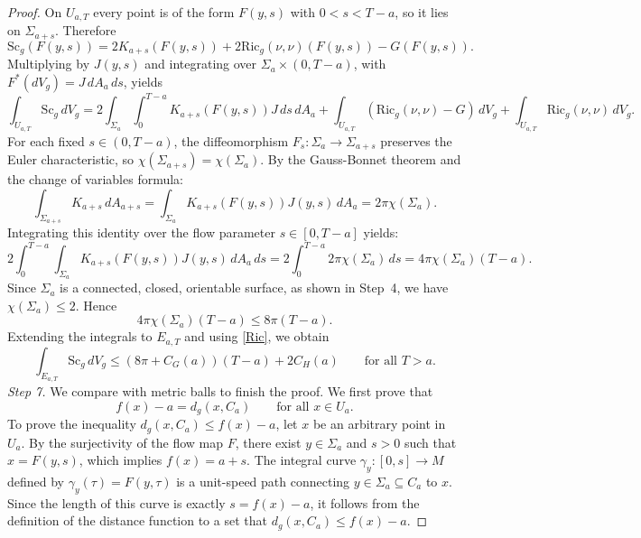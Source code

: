 \documentclass[12pt,oneside,a4paper]{article}
\theoremstyle{mytheorem}
\theoremstyle{remark}
\begin{document}
\begin{proof}
On $U_{a,T}$ every point is of the form $F(y,s)$ with $0<s<T-a$, so it lies on $\Sigma_{a+s}$. Therefore
\[
\mathrm{Sc}_g(F(y,s))=2K_{a+s}(F(y,s))+2\mathrm{Ric}_g(\nu,\nu)(F(y,s))-G(F(y,s)).
\]
Multiplying by $J(y,s)$ and integrating over $\Sigma_a\times(0,T-a)$, with $F^*(dV_g)=J\,dA_a\,ds$, yields
\[
\int_{U_{a,T}}\mathrm{Sc}_g\,dV_g=2\int_{\Sigma_a}\int_0^{T-a}K_{a+s}(F(y,s))J\,ds\,dA_a+\int_{U_{a,T}}(\mathrm{Ric}_g(\nu,\nu)-G)\,dV_g+\int_{U_{a,T}}\mathrm{Ric}_g(\nu,\nu)\,dV_g.
\]
For each fixed $s \in (0, T-a)$, the diffeomorphism $F_s : \Sigma_a \to \Sigma_{a+s}$ preserves the Euler characteristic, so $\chi(\Sigma_{a+s}) = \chi(\Sigma_a)$. By the Gauss-Bonnet theorem and the change of variables formula:$$\int_{\Sigma_{a+s}} K_{a+s} \, dA_{a+s} = \int_{\Sigma_a} K_{a+s}(F(y,s)) J(y,s) \, dA_a = 2\pi \chi(\Sigma_a).$$Integrating this identity over the flow parameter $s \in [0, T-a]$ yields:$$2 \int_0^{T-a} \int_{\Sigma_a} K_{a+s}(F(y,s)) J(y,s) \, dA_a \, ds = 2 \int_0^{T-a} 2\pi \chi(\Sigma_a) \, ds = 4\pi \chi(\Sigma_a)(T-a).$$
Since $\Sigma_a$ is a connected, closed, orientable surface, as shown in Step~4, we have $\chi(\Sigma_a)\le 2$. Hence
\[
4\pi \chi(\Sigma_a)(T-a)\le 8\pi (T-a).
\]
Extending the integrals to $E_{a,T}$ and using \eqref{Ric}, we obtain
\[
\int_{E_{a,T}} \mathrm{Sc}_g \, dV_g
\le (8\pi + C_G(a))(T-a) + 2C_H(a)
\qquad \text{for all } T>a .
\]
\textit{Step 7.} We compare with metric balls to finish the proof.
We first prove that
\[
f(x)-a=d_g(x,C_a)\qquad\text{for all }x\in U_a.
\]
 To prove the inequality $d_g(x, C_a) \le f(x) - a$, let $x$ be an arbitrary point in $U_a$. By the surjectivity of the flow map $F$, there exist $y \in \Sigma_a$ and $s > 0$ such that $x = F(y, s)$, which implies $f(x) = a + s$. The integral curve $\gamma_y : [0, s] \to M$ defined by $\gamma_y(\tau) = F(y, \tau)$ is a unit-speed path connecting $y \in \Sigma_a \subseteq C_a$ to $x$. Since the length of this curve is exactly $s = f(x) - a$, it follows from the definition of the distance function to a set that $d_g(x, C_a) \le f(x) - a$.
 

\end{proof}
\end{document}
